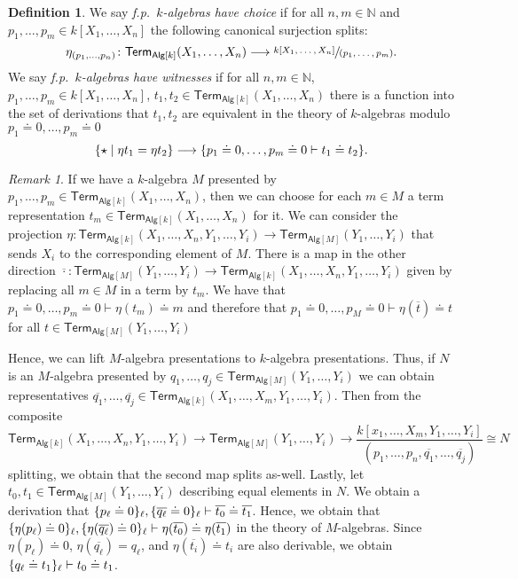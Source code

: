 \documentclass[10pt,a4paper]{article}
\theoremstyle{definition}
\newtheorem{definition}[theorem]{Definition}
\theoremstyle{remark}
\newtheorem{remark}[theorem]{Remark}
\newcommand{\nats}{\mathbb{N}}
\newcommand{\Alg}{\mathsf{Alg}}
\DeclarePairedDelimiter\set{\{}{\}}
\newcommand\Term{\mathsf{Term}}
\begin{document}
\begin{definition}
  We say \emph{f.p.~\(k\)-algebras have choice} if for all \(n, m \in \nats\) and \(p_1, \ldots, p_m \in k[X_1, \ldots, X_n]\) the following canonical surjection splits:
  \[
    \eta_{(p_1, \ldots, p_n)} \colon \Term_{\Alg[k]}(X_1, \ldots, X_n) \longrightarrow \sfrac{k[X_1, \ldots, X_n]}{(p_1, \ldots, p_m)}.
  \]
  We say \emph{f.p.~\(k\)-algebras have witnesses} if for all \(n, m \in \nats\), \(p_1, \ldots, p_m \in k[X_1, \ldots, X_n]\), \(t_1, t_2 \in \Term_{\Alg[k]}(X_1, \ldots, X_n)\) there is a function into the set of derivations that \(t_1, t_2\) are equivalent in the theory of \(k\)-algebras modulo \(p_1 \doteq 0, \ldots, p_m \doteq 0\)
  \[
    \set{\star \mid \eta t_1 = \eta t_2 } \longrightarrow \set{ p_1 \doteq 0, \ldots, p_m \doteq 0 \vdash t_1 \doteq t_2 }. 
  \]
\end{definition}
\begin{remark}\label{rem:choice-and-witness-property-descend}
  If we have a \(k\)-algebra \(M\) presented by \(p_1, \ldots, p_m \in \Term_{\Alg[k]}(X_1, \ldots, X_n)\), then we can choose for each \(m \in M\) a term representation \(t_m \in \Term_{\Alg[k]}(X_1, \ldots, X_n)\) for it.
  We can consider the projection \(\eta \colon \Term_{\Alg[k]}(X_1, \ldots, X_n, Y_1, \ldots, Y_i) \to \Term_{\Alg[M]}(Y_1, \ldots, Y_i)\) that sends \(X_i\) to the corresponding element of \(M\).
  There is a map in the other direction \(\overline\cdot \colon \Term_{\Alg[M]}(Y_1, \ldots, Y_i) \to \Term_{\Alg[k]}(X_1, \ldots, X_n, Y_1, \ldots, Y_i)\) given by replacing all \(m \in M\) in a term by \(t_m\).
  We have that \(p_1 \doteq 0, \ldots, p_m \doteq 0 \vdash \eta(t_m) \doteq m\) and therefore that \(p_1 \doteq 0, \ldots, p_M \doteq 0 \vdash \eta(\overline{t}) \doteq t\) for all \(t \in \Term_{\Alg[M]}(Y_1, \ldots, Y_i)\)
  
  Hence, we can lift \(M\)-algebra presentations to \(k\)-algebra presentations.
  Thus, if \(N\) is an \(M\)-algebra presented by \(q_1, \ldots, q_j \in \Term_{\Alg[M]}(Y_1, \ldots, Y_i)\) we can obtain representatives \(\overline{q_1}, \ldots, \overline{q_j} \in \Term_{\Alg[k]}(X_1, \ldots, X_m, Y_1, \ldots, Y_i)\).
  Then from the composite
  \[
    \Term_{\Alg[k]}(X_1, \ldots, X_n, Y_1, \ldots, Y_i) \longrightarrow \Term_{\Alg[M]}(Y_1, \ldots, Y_i) \longrightarrow \frac{k[x_1, \ldots, X_m, Y_1, \ldots, Y_i]}{(p_1, \ldots, p_n, \overline{q_1}, \ldots, \overline{q_j})} \cong N
  \]
  splitting, we obtain that the second map splits as-well.
  Lastly, let \(t_0, t_1 \in \Term_{\Alg[M]}(Y_1, \ldots, Y_i)\) describing equal elements in \(N\).
  We obtain a derivation that \(\set{p_\ell \doteq 0}_\ell, \set{\overline{q_\ell} \doteq 0}_\ell \vdash \overline{t_0} \doteq \overline{t_1}\).
  Hence, we obtain that \(\set{\eta(p_\ell) \doteq 0}_\ell, \set{\eta(\overline{q_\ell}) \doteq 0}_\ell \vdash \eta(\overline{t_0}) \doteq \eta(\overline{t_1})\) in the theory of \(M\)-algebras.
  Since \(\eta(p_\ell) \doteq 0\), \(\eta(\overline{q_\ell}) = q_\ell\), and \(\eta(\overline{t_i}) \doteq t_i\) are also derivable, we obtain \(\set{q_\ell \doteq t_1}_\ell \vdash t_0 \doteq t_1\).
\end{remark}
\end{document}
